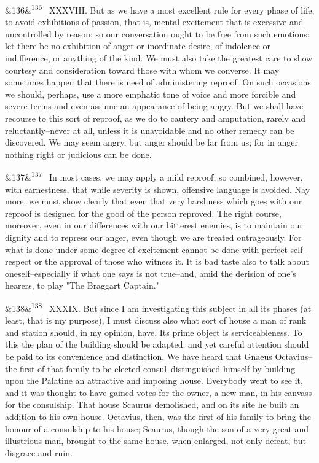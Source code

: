 \documentclass[12pt]{article}
\newcommand{\para}[1][]{\par\noindent\ifx&#1&\else\textsuperscript{\footnotesize #1}~\fi}
\begin{document}
\para[136] XXXVIII. But as we have a most excellent rule for every phase of life, to avoid exhibitions of passion, that is, mental excitement that is excessive and uncontrolled by reason; so our conversation ought to be free from such emotions: let there be no exhibition of anger or inordinate desire, of indolence or indifference, or anything of the kind. We must also take the greatest care to show courtesy and consideration toward those with whom we converse. It may sometimes happen that there is need of administering reproof. On such occasions we should, perhaps, use a more emphatic tone of voice and more forcible and severe terms and even assume an appearance of being angry. But we shall have recourse to this sort of reproof, as we do to cautery and amputation, rarely and reluctantly--never at all, unless it is unavoidable and no other remedy can be discovered. We may seem angry, but anger should be far from us; for in anger nothing right or judicious can be done.

\para[137] In most cases, we may apply a mild reproof, so combined, however, with earnestness, that while severity is shown, offensive language is avoided. Nay more, we must show clearly that even that very harshness which goes with our reproof is designed for the good of the person reproved. The right course, moreover, even in our differences with our bitterest enemies, is to maintain our dignity and to repress our anger, even though we are treated outrageously. For what is done under some degree of excitement cannot be done with perfect self-respect or the approval of those who witness it. It is bad taste also to talk about oneself--especially if what one says is not true--and, amid the derision of one's hearers, to play "The Braggart Captain."

\para[138] XXXIX. But since I am investigating this subject in all its phases (at least, that is my purpose), I must discuss also what sort of house a man of rank and station should, in my opinion, have. Its prime object is serviceableness. To this the plan of the building should be adapted; and yet careful attention should be paid to its convenience and distinction. We have heard that Gnaeus Octavius--the first of that family to be elected consul--distinguished himself by building upon the Palatine an attractive and imposing house. Everybody went to see it, and it was thought to have gained votes for the owner, a new man, in his canvass for the consulship. That house Scaurus demolished, and on its site he built an addition to his own house. Octavius, then, was the first of his family to bring the honour of a consulship to his house; Scaurus, though the son of a very great and illustrious man, brought to the same house, when enlarged, not only defeat, but disgrace and ruin.
\end{document}
